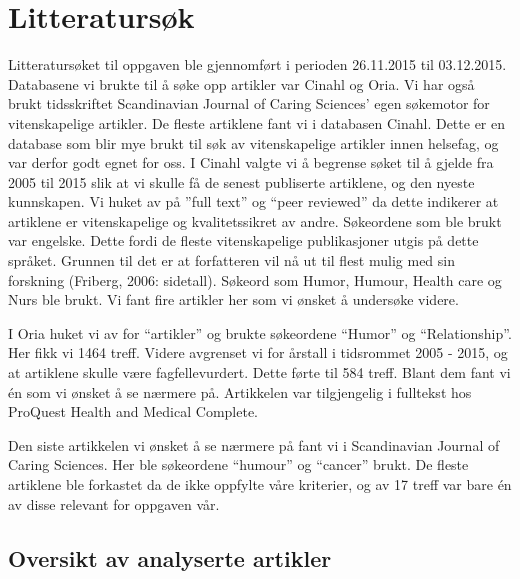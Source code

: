 \section{Litteratursøk}

Litteratursøket til oppgaven ble gjennomført i perioden 26.11.2015 til
03.12.2015. Databasene vi brukte til å søke opp artikler var Cinahl og Oria. Vi
har også brukt tidsskriftet Scandinavian Journal of Caring Sciences’ egen
søkemotor for vitenskapelige artikler. De fleste artiklene fant vi i databasen
Cinahl. Dette er en database som blir mye brukt til søk av vitenskapelige
artikler innen helsefag, og var derfor godt egnet for oss.  I Cinahl valgte vi
å begrense søket til å gjelde fra 2005 til 2015 slik at vi skulle få de senest
publiserte artiklene, og den nyeste kunnskapen. Vi huket av på ”full text” og
“peer reviewed” da dette indikerer at artiklene er vitenskapelige og
kvalitetssikret av andre. Søkeordene som ble brukt var engelske. Dette fordi de
fleste vitenskapelige publikasjoner utgis på dette språket. Grunnen til det er
at forfatteren vil nå ut til flest mulig med sin forskning (Friberg, 2006:
sidetall). Søkeord som Humor, Humour, Health care og Nurs ble brukt. Vi fant
fire artikler her som vi ønsket å undersøke videre.

I Oria huket vi av for “artikler” og brukte søkeordene “Humor” og
“Relationship”. Her fikk vi 1464 treff. Videre avgrenset vi for årstall i
tidsrommet 2005 - 2015, og at artiklene skulle være fagfellevurdert. Dette
førte til 584 treff. Blant dem fant vi én som vi ønsket å se nærmere på.
Artikkelen var tilgjengelig i fulltekst hos ProQuest Health and Medical
Complete.

Den siste artikkelen vi ønsket å se nærmere på fant vi i Scandinavian Journal
of Caring Sciences. Her ble søkeordene “humour” og “cancer” brukt. De fleste
artiklene ble forkastet da de ikke oppfylte våre kriterier, og av 17 treff var
bare én av disse relevant for oppgaven vår.

\subsection{Oversikt av analyserte artikler}

